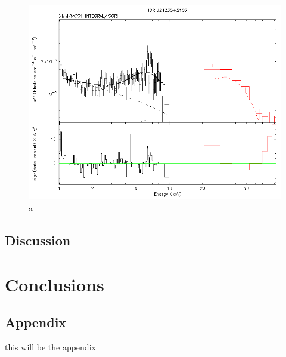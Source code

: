 \documentclass[oneside,a4paper,11pt]{report}
\begin{document}
\begin{figure}[!hbt]
\centering
\includegraphics[totalheight=8cm]{spec/7}
\caption{a}
\label{sp1} 
\end{figure}


\section{Discussion}

\chapter{Conclusions}



\nocite{2004bhwd.book.....S}
\nocite{2009A&A...496..121B}
\nocite{accpower:1}
\nocite{2005A&A...435..191S}
\nocite{2008A&A...489.1121R}
\nocite{2010A&A...520A..25Y}
\nocite{warner:1}
\nocite{2006A&A...450..117S}
\nocite{rybicki:1}
\nocite{1973PThPh..49.1184A_aizu}
\nocite{astrop_techniques_5th}
\nocite{xray_hanbook}
\nocite{1972ApJ...175..417N}
\nocite{kleczek}
\nocite{comp_obj1}
\nocite{1939MNRAS..99..673C}
\nocite{2012MNRAS.419..336M}




\clearpage

\appendix
\section*{Appendix}
this will be the appendix
\end{document}
